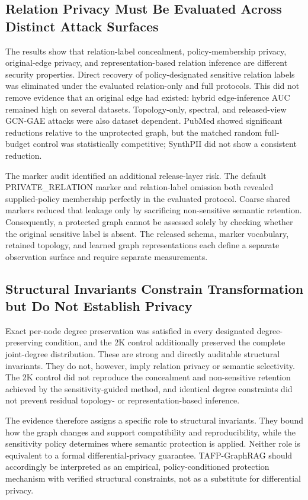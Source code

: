 \documentclass[preprint,12pt]{elsarticle}
\begin{document}
\subsection{Relation Privacy Must Be Evaluated Across Distinct Attack Surfaces}
The results show that relation-label concealment, policy-membership privacy, original-edge privacy, and representation-based relation inference are different security properties. Direct recovery of policy-designated sensitive relation labels was eliminated under the evaluated relation-only and full protocols. This did not remove evidence that an original edge had existed: hybrid edge-inference AUC remained high on several datasets. Topology-only, spectral, and released-view GCN-GAE attacks were also dataset dependent. PubMed showed significant reductions relative to the unprotected graph, but the matched random full-budget control was statistically competitive; SynthPII did not show a consistent reduction.

The marker audit identified an additional release-layer risk. The default PRIVATE\_RELATION marker and relation-label omission both revealed supplied-policy membership perfectly in the evaluated protocol. Coarse shared markers reduced that leakage only by sacrificing non-sensitive semantic retention. Consequently, a protected graph cannot be assessed solely by checking whether the original sensitive label is absent. The released schema, marker vocabulary, retained topology, and learned graph representations each define a separate observation surface and require separate measurements.

\subsection{Structural Invariants Constrain Transformation but Do Not Establish Privacy}
Exact per-node degree preservation was satisfied in every designated degree-preserving condition, and the 2K control additionally preserved the complete joint-degree distribution. These are strong and directly auditable structural invariants. They do not, however, imply relation privacy or semantic selectivity. The 2K control did not reproduce the concealment and non-sensitive retention achieved by the sensitivity-guided method, and identical degree constraints did not prevent residual topology- or representation-based inference.

The evidence therefore assigns a specific role to structural invariants. They bound how the graph changes and support compatibility and reproducibility, while the sensitivity policy determines where semantic protection is applied. Neither role is equivalent to a formal differential-privacy guarantee. TAFP-GraphRAG should accordingly be interpreted as an empirical, policy-conditioned protection mechanism with verified structural constraints, not as a substitute for differential privacy.
\end{document}
